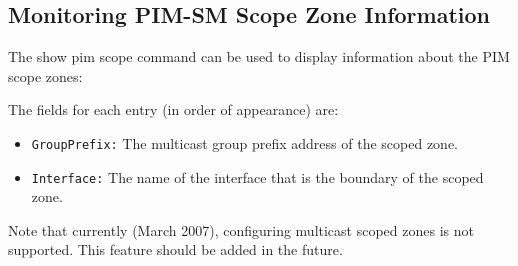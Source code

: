 \subsection{Monitoring PIM-SM Scope Zone Information}

The {\stt show pim scope} command can be used to display
information about the PIM scope zones:

\vspace{0.1in}
\noindent{}
\vspace{0.1in}

The fields for each entry (in order of appearance) are:
\begin{itemize}

  \item {\tt GroupPrefix:} The multicast group prefix address of the scoped
  zone.

  \item {\tt Interface:} The name of the interface that is the boundary
  of the scoped zone.

\end{itemize}

Note that currently (March 2007), configuring multicast scoped zones is not
supported. This feature should be added in the future.
